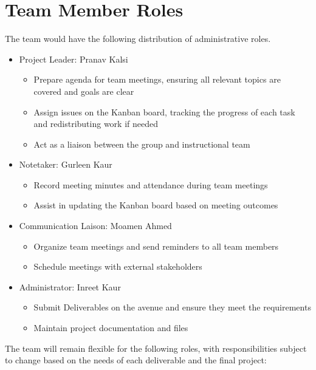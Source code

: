 \documentclass{article}
\begin{document}

\section{Team Member Roles}
 
The team would have the following distribution of administrative roles.

\begin{itemize}
\item Project Leader: Pranav Kalsi
\begin{itemize}
\item Prepare agenda for team meetings, ensuring all relevant topics are covered and goals are clear
\item Assign issues on the Kanban board, tracking the progress of each task and redistributing work if needed
\item Act as a liaison between the group and instructional team
\end{itemize}

\item Notetaker: Gurleen Kaur
\begin{itemize}
\item Record meeting minutes and attendance during team meetings
\item Assist in updating the Kanban board based on meeting outcomes
\end{itemize}

\item Communication Laison: Moamen Ahmed
\begin{itemize}
\item Organize team meetings and send reminders to all team members
\item Schedule meetings with external stakeholders
\end{itemize}

\item Administrator: Inreet Kaur
\begin{itemize}
\item Submit Deliverables on the avenue and ensure they meet the requirements
\item Maintain project documentation and files
\end{itemize}
\end{itemize} 

The team will remain flexible for the following roles, with responsibilities subject to change based on the needs of each deliverable and the final project:
\end{document}
